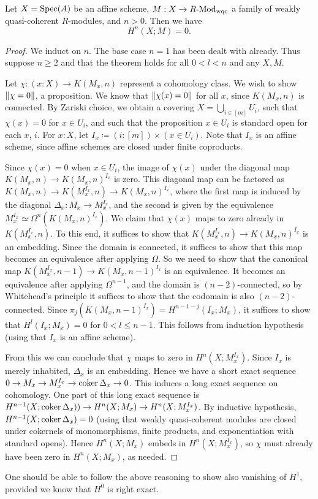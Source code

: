 \begin{theorem}
Let $X = \operatorname{Spec}(A)$ be an affine scheme, 
$M : X \to R\text{-}\mathrm{Mod}_{\text{wqc}}$ a family of weakly quasi-coherent $R$-modules,
and $n > 0$.
Then we have
	\[
		H^n(X;M) = 0.
		\]
\end{theorem}

\begin{proof}
We induct on $n$. The base case $n = 1$ has been dealt with already.
Thus suppose $n \ge 2$ and that the theorem holds for all $0 < l < n$ and
any $X,M$.

Let $\chi : (x : X) \to K(M_x, n)$ represent a cohomology class.
We wish to show $\lVert \chi = 0 \rVert$, a proposition.
We know that $\lVert \chi(x) = 0 \rVert$ for all $x$, since $K(M_x,n)$ is connected.
By Zariski choice, we obtain a covering
$X = \bigcup_{i \in [m]} U_i$,
such that $\chi(x) = 0$ for $x \in U_i$, and
such that the proposition $x \in U_i$ is standard open for each $x$, $i$.
For $x : X$, let $I_x \coloneqq (i : [m]) \times (x \in U_i)$.
Note that $I_x$ is an affine scheme, since affine schemes are closed under finite
coproducts.

Since $\chi(x) = 0$ when $x \in U_i$, the image of $\chi(x)$ under the diagonal
map $K(M_x,n) \to K(M_x,n)^{I_x}$ is zero.
This diagonal map can be factored as $K(M_x,n) \to K(M_x^{I_x},n) \to K(M_x,n)^{I_x}$,
where the first map is induced by the diagonal $\Delta_x : M_x \to M_x^{I_x}$,
and the second is given by the equivalence
$M_x^{I_x} \simeq \Omega^n(K(M_x,n)^{I_x})$.
We claim that $\chi(x)$ maps to zero already in $K(M_x^{I_x},n)$.
To this end, it suffices to show that
$K(M_x^{I_x},n) \to K(M_x,n)^{I_x}$ is an embedding.
Since the domain is connected, it suffices to show that this map becomes
an equivalence after applying $\Omega$.
So we need to show that the canonical map
$K(M_x^{I_x},n-1) \to K(M_x,n-1)^{I_x}$ is an equivalence.
It becomes an equivalence after applying $\Omega^{n-1}$, and
the domain is $(n-2)$-connected, so by Whitehead's principle it suffices 
to show that the codomain is also $(n-2)$-connected.
Since $\pi_j(K(M_x,n-1)^{I_x}) = H^{n-1-j}(I_x;M_x)$,
it suffices to show that $H^l(I_x;M_x) = 0$ for
$0 < l \le n-1$. This follows from induction hypothesis
(using that $I_x$ is an affine scheme).

From this we can conclude that $\chi$ maps to zero in
$H^n(X;M_x^{I_x})$.
Since $I_x$ is merely inhabited, $\Delta_x$ is an embedding.
Hence we have a short exact sequence
$0 \to M_x \to M_x^{I_x} \to \operatorname{coker} \Delta_x \to 0$.
This induces a long exact sequence on cohomology.
One part of this long exact sequence is
$H^{n-1}(X;\operatorname{coker}\Delta_x)) \to H^n(X;M_x) \to H^n(X;M_x^{I_x})$.
By inductive hypothesis, $H^{n-1}(X;\operatorname{coker}\Delta_x) = 0$
(using that weakly quasi-coherent modules are closed under
 cokernels of monomorphisms, finite products, and exponentiation
 with standard opens).
Hence $H^n(X;M_x)$ embeds in $H^n(X;M_x^{I_x})$, so
$\chi$ must already have been zero in $H^n(X;M_x)$, as needed.
\end{proof}

One should be able to follow the above reasoning to show also vanishing of
$H^1$, provided we know that $H^0$ is right exact.
